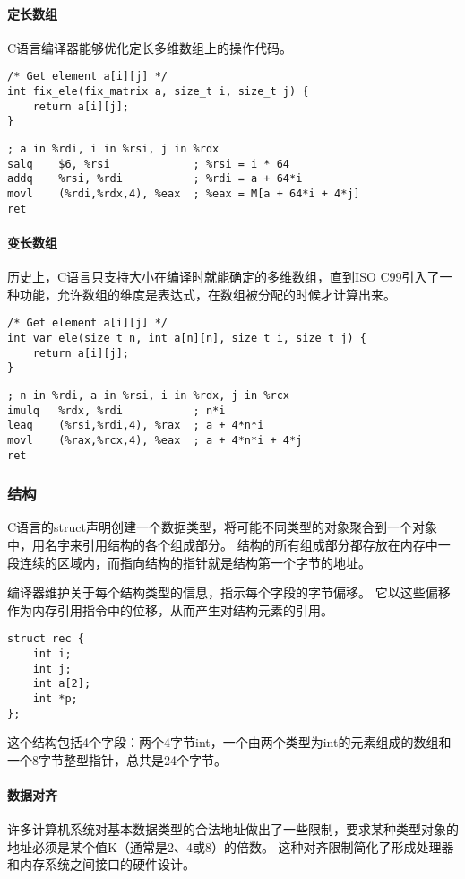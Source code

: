 \paragraph{定长数组}
C语言编译器能够优化定长多维数组上的操作代码。
\begin{lstlisting}[style=CStyle]
/* Get element a[i][j] */
int fix_ele(fix_matrix a, size_t i, size_t j) {
    return a[i][j];
}
\end{lstlisting}
\begin{lstlisting}[style=ASMStyle]
; a in %rdi, i in %rsi, j in %rdx
salq    $6, %rsi             ; %rsi = i * 64
addq    %rsi, %rdi           ; %rdi = a + 64*i
movl    (%rdi,%rdx,4), %eax  ; %eax = M[a + 64*i + 4*j]
ret
\end{lstlisting}
\paragraph{变长数组}
历史上，C语言只支持大小在编译时就能确定的多维数组，直到ISO C99引入了一种功能，允许数组的维度是表达式，在数组被分配的时候才计算出来。
\begin{lstlisting}[style=CStyle]
/* Get element a[i][j] */
int var_ele(size_t n, int a[n][n], size_t i, size_t j) {
    return a[i][j];
}
\end{lstlisting}
\begin{lstlisting}[style=ASMStyle]
; n in %rdi, a in %rsi, i in %rdx, j in %rcx
imulq   %rdx, %rdi           ; n*i
leaq    (%rsi,%rdi,4), %rax  ; a + 4*n*i
movl    (%rax,%rcx,4), %eax  ; a + 4*n*i + 4*j
ret
\end{lstlisting}
\subsubsection{结构}
C语言的struct声明创建一个数据类型，将可能不同类型的对象聚合到一个对象中，用名字来引用结构的各个组成部分。
结构的所有组成部分都存放在内存中一段连续的区域内，而指向结构的指针就是结构第一个字节的地址。

编译器维护关于每个结构类型的信息，指示每个字段的字节偏移。
它以这些偏移作为内存引用指令中的位移，从而产生对结构元素的引用。
\begin{lstlisting}[style=CStyle]
struct rec {
    int i;
    int j;
    int a[2];
    int *p;
};
\end{lstlisting}

这个结构包括4个字段：两个4字节int，一个由两个类型为int的元素组成的数组和一个8字节整型指针，总共是24个字节。

\paragraph{数据对齐}
许多计算机系统对基本数据类型的合法地址做出了一些限制，要求某种类型对象的地址必须是某个值K（通常是2、4或8）的倍数。
这种对齐限制简化了形成处理器和内存系统之间接口的硬件设计。


